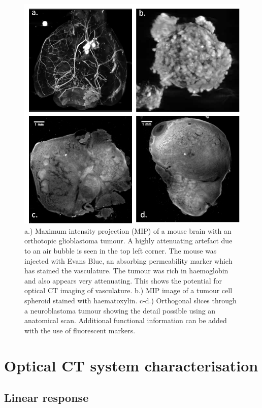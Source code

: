 	\begin{figure}[H]
		\centering
		\includegraphics[width = \textwidth]{meth_img/tumours.png}
		\caption{a.) Maximum intensity projection (MIP) of a mouse brain with an orthotopic glioblastoma tumour. A highly attenuating artefact due to an air bubble is seen in the top left corner. The mouse was injected with Evans Blue, an absorbing permeability marker which has stained the vasculature. The tumour was rich in haemoglobin and also appears very attenuating. This shows the potential for optical CT imaging of vasculature. b.) MIP image of a tumour cell spheroid stained with haematoxylin. c-d.) Orthogonal slices through a neuroblastoma tumour showing the detail possible using an anatomical scan. Additional functional information can be added with the use of fluorescent markers. }
		\label{fig:tumours}
	\end{figure}









\section{Optical CT system characterisation}

\subsection{Linear response}

